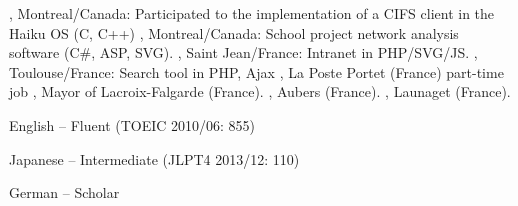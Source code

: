 \documentclass[english]{ecv}
\makeatletter
\renewcommand{\ecvBSec}[2][\ecv@lang]{%
  \ifthenelse{\equal{#1}{\ecv@lang}}{%
    \tabularnewline%
    \ecvLeft{\textsc{\Large{\textcolor{ecv@ColBlue}{#2}}} \medskip } &%
    \tabularnewline%
  }{}%
}
\makeatother
\begin{document}
\begin{ecv}
                 {, Montreal/Canada: Participated
                  to the implementation of a CIFS client in the Haiku OS (C, C++)
                 }
                 {, Montreal/Canada:
                 School project network analysis software (C\#, ASP, SVG).
                 }
                 {, Saint Jean/France: Intranet in PHP/SVG/JS.
                 }
                 {, Toulouse/France:
                 Search tool in PHP, Ajax
                 }
 {, La Poste Portet (France) part-time job}
 {, Mayor of Lacroix-Falgarde (France).}
 {, Aubers (France).}
 {, Launaget (France).}


\ecvBSec{\hypertarget{hypertarget:\ecvLanguages}{\ecvLanguages}}


 {
  \begin{description}
    \begin{spacing}{-1}
    \item[English] -- Fluent (TOEIC 2010/06: 855)
    \item[Japanese] -- Intermediate (JLPT4 2013/12: 110)
    \item[German] -- Scholar
    \end{spacing}
  \end{description}
}




\end{ecv}
\end{document}
